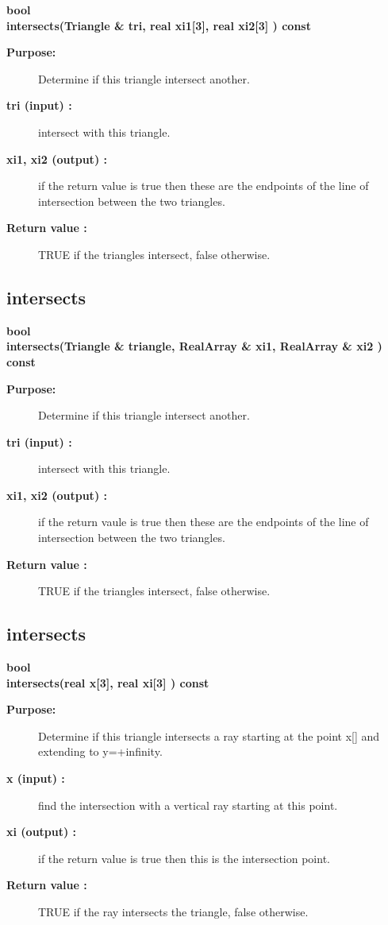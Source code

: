 \begin{flushleft} \textbf{%
bool  \\ 
\settowidth{\TriangleIncludeArgIndent}{intersects(}%
intersects(Triangle \& tri, real xi1[3], real xi2[3] ) const
}\end{flushleft}
\begin{description}
\item[{\bf Purpose:}]  
   Determine if this triangle intersect another.
\item[{\bf tri (input) :}]  intersect with this triangle.
\item[{\bf xi1, xi2 (output) :}]  if the return value is true then these are the endpoints
    of the line of intersection between the two triangles.
\item[{\bf Return value :}]  TRUE if the triangles intersect, false otherwise.
\end{description}
\subsection{intersects}
 
\begin{flushleft} \textbf{%
bool  \\ 
\settowidth{\TriangleIncludeArgIndent}{intersects(}%
intersects(Triangle \& triangle, RealArray \& xi1, RealArray \& xi2 ) const
}\end{flushleft}
\begin{description}
\item[{\bf Purpose:}]  
   Determine if this triangle intersect another.
\item[{\bf tri (input) :}]  intersect with this triangle.
\item[{\bf xi1, xi2 (output) :}]  if the return vaule is true then these are the endpoints
    of the line of intersection between the two triangles.
\item[{\bf Return value :}]  TRUE if the triangles intersect, false otherwise.
\end{description}
\subsection{intersects}
 
\begin{flushleft} \textbf{%
bool  \\ 
\settowidth{\TriangleIncludeArgIndent}{intersects(}%
intersects(real x[3], real xi[3] ) const
}\end{flushleft}
\begin{description}
\item[{\bf Purpose:}]  
   Determine if this triangle intersects a ray starting at the point x[] and
     extending to y=+infinity.
\item[{\bf x (input) :}]  find the intersection with a vertical ray starting at this point.
\item[{\bf xi (output) :}]  if the return value is true then this is the intersection point.
\item[{\bf Return value :}]  TRUE if the ray intersects the triangle, false otherwise.
\end{description}
